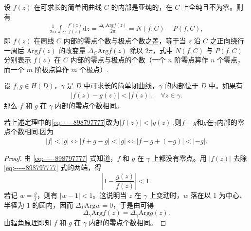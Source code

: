 \documentclass[../../main.tex]{subfiles}%
\begin{document}
\begin{theorem}[辐角原理]\label{theorem:辐角原理-一般形式}
设 \(f(z)\) 在可求长的简单闭曲线 \(C\) 的内部是亚纯的，在 \(C\) 上全纯且不为零。则有
\begin{align*}
\frac{1}{2\pi \mathrm{i}} \int_{C} \frac{f'(z)}{f(z)} \mathrm{d}z =  \frac{\Delta_C \text{Arg} f(z)}{2\pi}=N(f,C) - P(f,C),
\end{align*}
即 \(f(z)\) 在周线 \(C\) 内部的零点个数与极点个数之差，等于当 \(z\) 沿 \(C\) 之正向绕行一周后 \(\text{Arg} f(z)\) 的改变量 \(\Delta_C \text{Arg} f(z)\) 除以 \(2\pi\)，式中 \(N(f,C)\) 与 \(P(f,C)\) 分别表示 \(f(z)\) 在 \(C\) 内部的零点与极点的个数（一个 \(n\) 阶零点算作 \(n\) 个零点，而一个 \(m\) 阶极点算作 \(m\) 个极点）.
\end{theorem}

\begin{theorem}[Rouché(鲁歇)定理]\label{theorem:Rouché定理-定理4.4.3}
设 \( f, g \in H(D) \)，\( \gamma \) 是 \( D \) 中可求长的简单闭曲线，\( \gamma \) 的内部位于 \( D \) 中。如果有
\begin{align}\label{eq:-----898797777}
|f(z) - g(z)| < |f(z)|,\quad \forall z\in \gamma.
\end{align}
那么 \( f \) 和 \( g \) 在 \( \gamma \) 内部的零点个数相同。
\end{theorem}
\begin{remark}
若上述定理中的\eqref{eq:-----898797777}改为$\left| f\left( z \right) \right|<\left| g\left( z \right) \right|$,则$f\pm g$和$g$在$\gamma $内部的零点个数相同.因为
\begin{align*}
\left| f \right|<\left| g \right|\Longleftrightarrow \left| f+g-g \right|<\left| g \right|\Longleftrightarrow \left| f-g+\left( -g \right) \right|<\left| -g \right|.
\end{align*}
\end{remark}
\begin{proof}
由 \eqref{eq:-----898797777} 式知道，\( f \) 和 \( g \) 在 \( \gamma \) 上都没有零点。用 \( |f(z)| \) 去除 \eqref{eq:-----898797777} 式的两端，得
\[
\left| 1 - \frac{g(z)}{f(z)} \right| < 1.
\]
若记 \( w = \frac{g}{f} \)，则有 \( |w - 1| < 1 \)。这说明当 \( z \) 在 \( \gamma \) 上变动时，\( w \) 落在以 1 为中心、半径为 1 的圆内，因而 \( \Delta_{\Gamma} \text{Arg} w = 0 \)，于是由可得
\[
\Delta_{\gamma} \text{Arg} f(z) = \Delta_{\gamma} \text{Arg} g(z).
\]
由\hyperref[theorem:辐角原理-定理4.4.2]{辐角原理}即知 \( f \) 和 \( g \) 在 \( \gamma \) 内部的零点个数相同。 
\end{proof}
\end{document}
